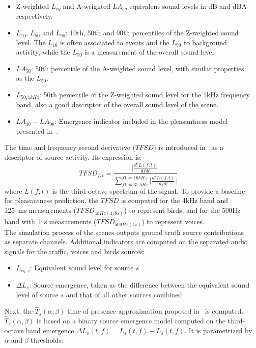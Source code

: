 \documentclass[11pt,a4paper]{article}
\begin{document}
\begin{itemize}
\item Z-weighted $L_{eq}$ and A-weighted $LA_{eq}$ equivalent sound levels in dB and dBA respectively.
\item $L_{10}$, $L_{50}$ and $L_{90}$: 10th, 50th and 90th percentiles of the Z-weighted sound level. The $L_{10}$ is often associated to events and the $L_{90}$ to background activity, while the $L_{50}$ is a measurement of the overall sound level.
\item $LA_{50}$: 50th percentile of the A-weighted sound level, with similar properties as the $L_{50}$.
\item $L_{50, 1kHz}$: 50th percentile of the Z-weighted sound level for the 1kHz frequency band, also a good descriptor of the overall sound level of the scene.
\item $LA_{10}-LA_{90}$: Emergence indicator included in the pleasantness model presented in~\cite{ricciardi2014}.
\end{itemize}

The time and frequency second derivative ($TFSD$) is introduced in~\cite{aumond2017} as a descriptor of source activity. Its expression is:
\begin{equation}
TFSD_{f, t} = \frac{\lvert\frac{d^2L(f, t)}{dfdt}\rvert}{\sum_{f1=31.5Hz}^{f1=16kHz}\lvert\frac{d^2L(f, t)}{dfdt}\rvert}
\end{equation}
where $L(f, t)$ is the third-octave spectrum of the signal. To provide a baseline for pleasantness prediction, the $TFSD$ is computed for the 4kHz band and 125~ms measurements ($TFSD_{4kHz(1/8s)}$) to represent birds, and for the 500Hz band with 1~s measurements ($TFSD_{500Hz(1s)}$) to represent voices.\\

The simulation process of the scenes outputs ground truth source contributions as separate channels. Additional indicators are computed on the separated audio signals for the traffic, voices and birds sources:

\begin{itemize}
\item $L_{eq, s}$: Equivalent sound level for source $s$
\item $\Delta L_{s}$: Source emergence, taken as the difference between the equivalent sound level of source $s$ and that of all other sources combined
\end{itemize}

Next, the $\hat T_s(\alpha, \beta)$ time of presence approximation proposed in~\cite{gontier2018} is computed. $\hat T_s(\alpha, \beta)$ is based on a binary source emergence model computed on the third-octave band emergence $\Delta L_{s}(t, f) = L_s(t, f) - L_{\bar{s}}(t, f)$. It is parametrized by $\alpha$ and $\beta$ thresholds:
\end{document}
